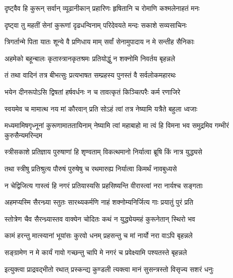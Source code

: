 \twolineshloka
{दृष्ट्वैव हि कुरून् सर्वान् व्यूढानीकान् प्रहारिणः}
{हृषितानि च रोमाणि कश्मलेनाहतं मनः}



\twolineshloka
{दृष्ट्वा तु महतीं सेनां कुरूणां दृढधन्विनाम्}
{परिदेवयते मन्दः सकाशे सव्यसाचिनः}


\twolineshloka
{त्रिगर्तान्मे पिता यातः शून्ये वै प्रणिधाय माम्}
{सर्वां सेनामुपादाय न मे सन्तीह सैनिकाः}


\twolineshloka
{अहमेको बहून्बालः कृतास्त्रानकृतश्रमः}
{प्रतियोद्धुं न शक्नोमि निवर्तय बृहन्नले}



\twolineshloka
{तं तथा वादिनं तत्र बीभत्सुः प्रत्यभाषत}
{सम्प्रहस्य पुनस्तं वै सर्वलोकमहारथः}


\twolineshloka
{भयेन दीनरूपोऽसि द्विषतां हर्षवर्धनः}
{न च तावत्कृतं किञ्चित्परैः कर्म रणाजिरे}


\twolineshloka
{स्वयमेव च मामात्थ नय मां कौरवान् प्रति}
{सोऽहं त्वां तत्र नेष्यामि यत्रैते बहुला ध्वजाः}


\threelineshloka
{मध्यमामिषगृध्नूनां कुरूणामाततायिनाम्}
{नेष्यामि त्वां महाबाहो मा त्वं हि विमना भव}
{समुद्रमिव गम्भीरं कुरुसैन्यमरिन्दम}


\twolineshloka
{स्त्रीसकाशे प्रतिज्ञाय पुरुषाणां हि शृण्वताम्}
{विकत्थमानो निर्यात्वा ब्रूषि किं नात्र युद्ध्यसे}


\twolineshloka
{तथा स्त्रीषु प्रतिश्रुत्य पौरुषं पुरुषेषु च}
{रथमारुह्य निर्यात्वा किमर्थं नावबुध्यसे}


\twolineshloka
{न चेद्विजित्य गास्त्वं हि नगरं प्रतियास्यसि}
{प्रहसिष्यन्ति वीरास्त्वां नरा नार्यश्च सङ्गताः}


\twolineshloka
{अहमप्यस्मि सैरन्ध्र्या स्तुतः सारथ्यकर्मणि}
{नाहं शक्नोम्यनिर्जित्य गाः प्रयातुं पुरं प्रति}


\twolineshloka
{स्तोत्रेण चैव सैरन्ध्र्यास्तव वाक्येन चोदितः}
{कथं न युद्ध्येयमहं कुरूनेतान् स्थिरो भव}




\twolineshloka
{कामं हरन्तु मात्स्यानां भूयांसः कुरवो धनम्}
{प्रहसन्तु च मां नार्यो नरा वाऽपि बृहन्नले}


\twolineshloka
{सङ्ग्रामेण न मे कार्यं गावो गच्छन्तु चापि मे}
{नगरं च प्रवेक्ष्यामि पश्यतस्ते बृहन्नले}



\twolineshloka
{इत्युक्त्वा प्राद्रवद्भीतो रथात् प्रस्कन्द्य कुण्डली}
{त्यक्त्वा मानं सुसन्त्रस्तो विसृज्य सशरं धनुः}


